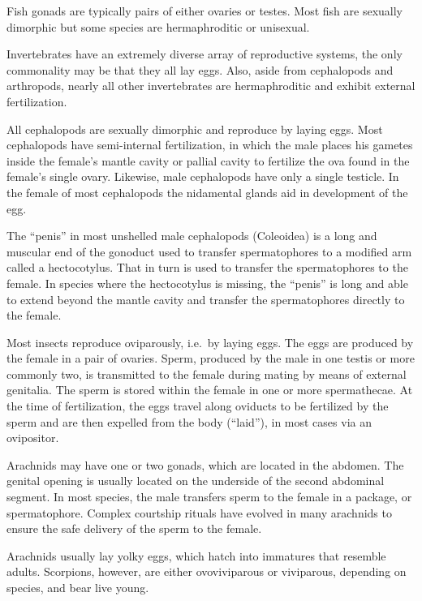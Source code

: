 Fish gonads are typically pairs of either ovaries or testes. Most fish are sexually dimorphic but some species are hermaphroditic or unisexual.

Invertebrates have an extremely diverse array of reproductive systems, the only commonality may be that they all lay eggs. Also, aside from cephalopods and arthropods, nearly all other invertebrates are hermaphroditic and exhibit external fertilization.

All cephalopods are sexually dimorphic and reproduce by laying eggs. Most cephalopods have semi-internal fertilization, in which the male places his gametes inside the female's mantle cavity or pallial cavity to fertilize the ova found in the female's single ovary. Likewise, male cephalopods have only a single testicle. In the female of most cephalopods the nidamental glands aid in development of the egg.

The ``penis'' in most unshelled male cephalopods (Coleoidea) is a long and muscular end of the gonoduct used to transfer spermatophores to a modified arm called a hectocotylus. That in turn is used to transfer the spermatophores to the female. In species where the hectocotylus is missing, the ``penis'' is long and able to extend beyond the mantle cavity and transfer the spermatophores directly to the female.

Most insects reproduce oviparously, i.e.~by laying eggs. The eggs are produced by the female in a pair of ovaries. Sperm, produced by the male in one testis or more commonly two, is transmitted to the female during mating by means of external genitalia. The sperm is stored within the female in one or more spermathecae. At the time of fertilization, the eggs travel along oviducts to be fertilized by the sperm and are then expelled from the body (``laid''), in most cases via an ovipositor.

Arachnids may have one or two gonads, which are located in the abdomen. The genital opening is usually located on the underside of the second abdominal segment. In most species, the male transfers sperm to the female in a package, or spermatophore. Complex courtship rituals have evolved in many arachnids to ensure the safe delivery of the sperm to the female.

Arachnids usually lay yolky eggs, which hatch into immatures that resemble adults. Scorpions, however, are either ovoviviparous or viviparous, depending on species, and bear live young.

